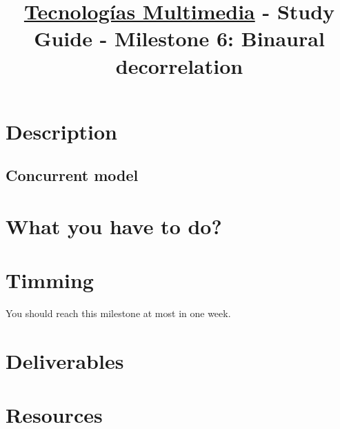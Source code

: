 \title{\href{https://www.ual.es/estudios/grados/presentacion/plandeestudios/asignatura/4015/40154321?idioma=zh_CN}{Tecnologías Multimedia} - Study Guide - Milestone 6: Binaural decorrelation}

\maketitle

\section{Description}


\subsection{Concurrent model}


\section{What you have to do?}

\section{Timming}

You should reach this milestone at most in one week.

\section{Deliverables}

\section{Resources}


